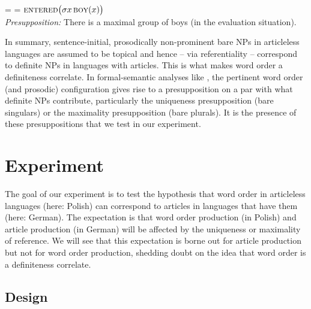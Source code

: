 \documentclass[output=paper]{langscibook}
\begin{document}
\ea {} =  = $\textsc{entered}\big(\sigma x\,\textsc{boy}(x)\big)$ \label{sim-dem:ex:denot-initial-pl}\\
\textit{Presupposition:} There is a maximal group of boys (in the evaluation situation).
\z

\noindent In summary, sentence-initial, prosodically non-prominent bare NPs in articleless languages are assumed to be topical and hence -- via referentiality -- correspond to definite NPs in languages with articles. This is what makes word order a definiteness correlate. In formal-semantic analyses like , the pertinent word order (and prosodic) configuration gives rise to a presupposition on a par with what definite NPs contribute, particularly the uniqueness presupposition (bare singulars) or the maximality presupposition (bare plurals). It is the presence of these presuppositions that we test in our experiment.

\section{Experiment}\label{sim-dem:sec:exp}

The goal of our experiment is to test the hypothesis that word order in articleless languages (here: Polish) can correspond to articles in languages that have them (here: German). The expectation is that word order production (in Polish) and article production (in German) will be affected by the uniqueness or maximality of reference. We will see that this expectation is borne out for article production but not for word order production, shedding doubt on the idea that word order is a definiteness correlate.

\subsection{Design}\label{sim-dem:sec:design}
\end{document}
